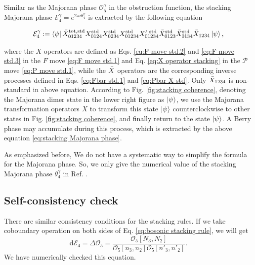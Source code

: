 \documentclass[%
 reprint,
 amsmath,amssymb,
 aps,
prb,
]{revtex4-2}
\begin{document}
Similar as the Majorana phase $\mathcal{O}^{\gamma}_5$ in the obstruction function, the stacking Majorana phase $\mathcal{E}_{4}^{\gamma}=e^{2\pi i\theta _{4}^{\gamma }}$ is extracted by the following equation 
\begin{widetext}
\begin{equation}
\mathcal{E}_{4}^{\gamma} := \bra{\psi} \Bar{X}^{\mathrm{tot,std}}_{01234} X^{\mathrm{std}}_{0124} X^{\mathrm{std}}_{0234} X^{\mathrm{std}}_{01234} X^{\prime \ \mathrm{std}}_{01234} \Bar{X}^{\mathrm{std}}_{0123} \Bar{X}^{\mathrm{std}}_{0134} \Bar{X}_{1234} \ket{\psi} ,\label{eq:stacking Majorana phase}
\end{equation}
\end{widetext}
where the $X$ operators are defined as Eqs. \eqref{eq:F move std.2} and \eqref{eq:F move std.3} in the $F$ move \eqref{eq:F move std.1} and Eq. \eqref{eq:X operator stacking} in the $\mathcal{P}$ move \eqref{eq:P move std.1}, while the $\Bar{X}$ operators are the corresponding inverse processes defined in Eqs. \eqref{eq:Fbar std.1} and \eqref{eq:Pbar X std}.
Only $\Bar{X}_{1234}$ is non-standard in above equation.
According to Fig. \ref{fig:stacking coherence}, denoting the Majorana dimer state in the lower right figure as $\ket{\psi}$, we use the Majorana transformation operators $X$ to transform this state $\ket{\psi}$ counterclockwise to other states in Fig. \ref{fig:stacking coherence}, and finally return to the state $\ket{\psi}$.
A Berry phase may accumulate during this process, which is extracted by the above equation \eqref{eq:stacking Majorana phase}.

As emphasized before, We do not have a systematic way to simplify the formula for the Majorana phase.
So, we only give the numerical value of the stacking Majorana phase $\theta _{4}^{\gamma }$ in Ref. \cite{}.

\subsection{Self-consistency check}

There are similar consistency conditions for the stacking rules.
If we take coboundary operation on both sides of Eq. \eqref{eq:bosonic stacking rule}, we will get 
\begin{equation}
\mathrm{d}\mathcal{E}_{4} =\Delta \mathcal{O}_{5} =\frac{\mathcal{O}_{5} [N_{3} ,N_{2} ]}{\mathcal{O}_{5} [n_{3} ,n_{2} ]\mathcal{O}_{5} [n'_{3} ,n'_{2} ]} .
\end{equation}
We have numerically checked this equation.
\end{document}
